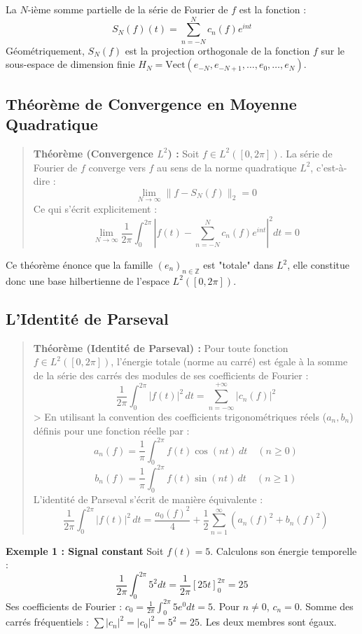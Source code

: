 \documentclass[11pt,a4paper]{article}
\begin{document}
La $N$-ième somme partielle de la série de Fourier de $f$ est la fonction :
$$S_N(f)(t) = \sum_{n=-N}^{N} c_n(f) e^{int}$$
Géométriquement, $S_N(f)$ est la projection orthogonale de la fonction $f$ sur le sous-espace de dimension finie $H_N = \text{Vect}(e_{-N}, e_{-N+1}, \dots, e_0, \dots, e_N)$.


\subsection{Théorème de Convergence en Moyenne Quadratique}


\begin{quote}\textbf{Théorème (Convergence $L^2$) :}
Soit $f \in L^2([0, 2\pi])$. La série de Fourier de $f$ converge vers $f$ au sens de la norme quadratique $L^2$, c'est-à-dire :
$$\lim_{N \to \infty} \| f - S_N(f) \|_2 = 0$$
Ce qui s'écrit explicitement :
$$\lim_{N \to \infty} \frac{1}{2\pi} \int_0^{2\pi} \left| f(t) - \sum_{n=-N}^N c_n(f) e^{int} \right|^2 dt = 0$$\end{quote}

Ce théorème énonce que la famille $(e_n)_{n \in \mathbb{Z}}$ est "totale" dans $L^2$, elle constitue donc une base hilbertienne de l'espace $L^2([0, 2\pi])$.

\subsection{L'Identité de Parseval}


\begin{quote}\textbf{Théorème (Identité de Parseval) :}
Pour toute fonction $f \in L^2([0, 2\pi])$, l'énergie totale (norme au carré) est égale à la somme de la série des carrés des modules de ses coefficients de Fourier :
$$\frac{1}{2\pi} \int_0^{2\pi} |f(t)|^2 \, dt = \sum_{n=-\infty}^{+\infty} |c_n(f)|^2$$
> En utilisant la convention des coefficients trigonométriques réels ($a_n, b_n$) définis pour une fonction réelle par :
$$a_n(f) = \frac{1}{\pi} \int_0^{2\pi} f(t) \cos(nt) \, dt \quad (n \ge 0)$$
$$b_n(f) = \frac{1}{\pi} \int_0^{2\pi} f(t) \sin(nt) \, dt \quad (n \ge 1)$$
L'identité de Parseval s'écrit de manière équivalente :
$$\frac{1}{2\pi} \int_0^{2\pi} |f(t)|^2 \, dt = \frac{a_0(f)^2}{4} + \frac{1}{2} \sum_{n=1}^\infty \left( a_n(f)^2 + b_n(f)^2 \right)$$\end{quote}

\textbf{Exemple 1 : Signal constant}
Soit $f(t) = 5$.
Calculons son énergie temporelle :
$$\frac{1}{2\pi} \int_0^{2\pi} 5^2 dt = \frac{1}{2\pi} [25t]_0^{2\pi} = 25$$
Ses coefficients de Fourier : $c_0 = \frac{1}{2\pi} \int_0^{2\pi} 5 e^0 dt = 5$. Pour $n \neq 0$, $c_n = 0$.
Somme des carrés fréquentiels : $\sum |c_n|^2 = |c_0|^2 = 5^2 = 25$.
Les deux membres sont égaux.
\end{document}
